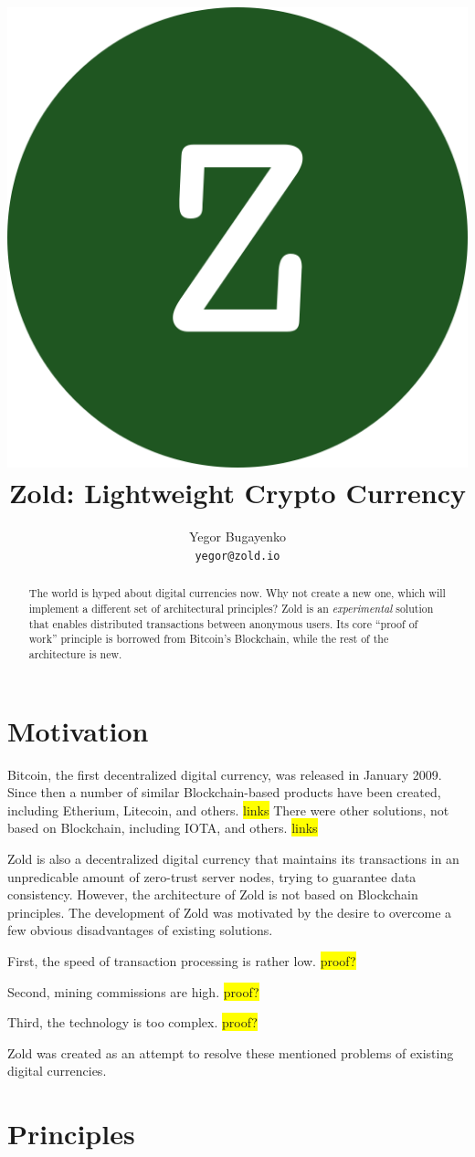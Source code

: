 \documentclass[11pt,oneside]{article}
\title{\includegraphics[scale=0.05]{logo.png}\\Zold: Lightweight Crypto Currency}
\author{Yegor Bugayenko\\\texttt{yegor@zold.io}}
\begin{document}
\raggedbottom
\maketitle
\begin{abstract}
The world is hyped about digital currencies now. Why not create a new one,
which will implement a different set of architectural principles? Zold is
an \emph{experimental} solution that enables distributed transactions between
anonymous users. Its core ``proof of work'' principle is borrowed from Bitcoin's Blockchain,
while the rest of the architecture is new.
\end{abstract}

\section{Motivation}

Bitcoin, the first decentralized digital currency, was released in
January 2009. Since then a number of similar Blockchain-based products have been
created, including Etherium, Litecoin, and others. \colorbox{yellow}{links} There were other solutions,
not based on Blockchain, including IOTA, and others. \colorbox{yellow}{links}

Zold is also a decentralized digital currency that maintains its transactions
in an unpredicable amount of zero-trust server nodes, trying to guarantee
data consistency. However, the architecture of Zold is not based on Blockchain
principles. The development of Zold was motivated by the desire to overcome
a few obvious disadvantages of existing solutions.

First, the speed of transaction processing is rather low. \colorbox{yellow}{proof?}

Second, mining commissions are high. \colorbox{yellow}{proof?}

Third, the technology is too complex. \colorbox{yellow}{proof?}

Zold was created as an attempt to resolve these mentioned problems
of existing digital currencies.

\section{Principles}
\end{document}
